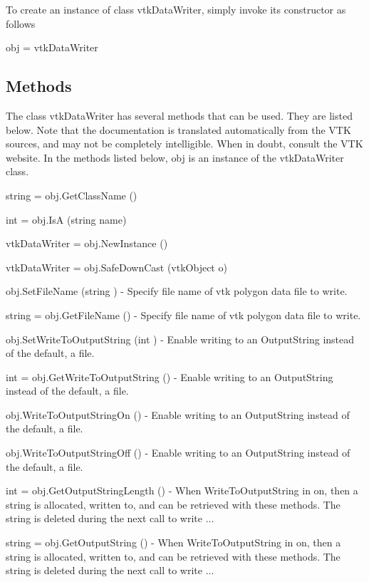 To create an instance of class vtk\-Data\-Writer, simply invoke its constructor as follows \begin{DoxyVerb}  obj = vtkDataWriter
\end{DoxyVerb}
 \hypertarget{vtkwidgets_vtkxyplotwidget_Methods}{}\subsection{Methods}\label{vtkwidgets_vtkxyplotwidget_Methods}
The class vtk\-Data\-Writer has several methods that can be used. They are listed below. Note that the documentation is translated automatically from the V\-T\-K sources, and may not be completely intelligible. When in doubt, consult the V\-T\-K website. In the methods listed below, {\ttfamily obj} is an instance of the vtk\-Data\-Writer class. 
\begin{DoxyItemize}
\item {\ttfamily string = obj.\-Get\-Class\-Name ()}  
\item {\ttfamily int = obj.\-Is\-A (string name)}  
\item {\ttfamily vtk\-Data\-Writer = obj.\-New\-Instance ()}  
\item {\ttfamily vtk\-Data\-Writer = obj.\-Safe\-Down\-Cast (vtk\-Object o)}  
\item {\ttfamily obj.\-Set\-File\-Name (string )} -\/ Specify file name of vtk polygon data file to write.  
\item {\ttfamily string = obj.\-Get\-File\-Name ()} -\/ Specify file name of vtk polygon data file to write.  
\item {\ttfamily obj.\-Set\-Write\-To\-Output\-String (int )} -\/ Enable writing to an Output\-String instead of the default, a file.  
\item {\ttfamily int = obj.\-Get\-Write\-To\-Output\-String ()} -\/ Enable writing to an Output\-String instead of the default, a file.  
\item {\ttfamily obj.\-Write\-To\-Output\-String\-On ()} -\/ Enable writing to an Output\-String instead of the default, a file.  
\item {\ttfamily obj.\-Write\-To\-Output\-String\-Off ()} -\/ Enable writing to an Output\-String instead of the default, a file.  
\item {\ttfamily int = obj.\-Get\-Output\-String\-Length ()} -\/ When Write\-To\-Output\-String in on, then a string is allocated, written to, and can be retrieved with these methods. The string is deleted during the next call to write ...  
\item {\ttfamily string = obj.\-Get\-Output\-String ()} -\/ When Write\-To\-Output\-String in on, then a string is allocated, written to, and can be retrieved with these methods. The string is deleted during the next call to write ...  

\end{DoxyItemize}
